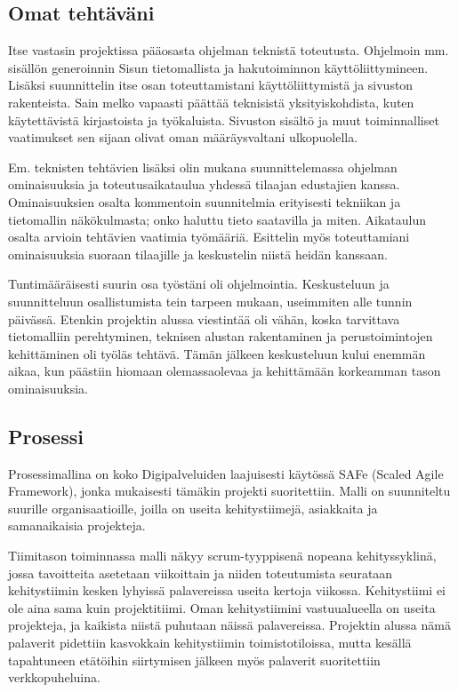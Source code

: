 \documentclass{article}
\begin{document}
\subsection{Omat tehtäväni}

Itse vastasin projektissa pääosasta ohjelman teknistä toteutusta. Ohjelmoin mm.
sisällön generoinnin Sisun tietomallista ja hakutoiminnon käyttöliittymineen.
Lisäksi suunnittelin itse osan toteuttamistani käyttöliittymistä ja sivuston
rakenteista. Sain melko vapaasti päättää teknisistä yksityiskohdista, kuten
käytettävistä kirjastoista ja työkaluista. Sivuston sisältö ja muut
toiminnalliset vaatimukset sen sijaan olivat oman määräysvaltani ulkopuolella.

Em. teknisten tehtävien lisäksi olin mukana suunnittelemassa ohjelman
ominaisuuksia ja toteutusaikataulua yhdessä tilaajan edustajien kanssa.
Ominaisuuksien osalta kommentoin suunnitelmia erityisesti tekniikan ja
tietomallin näkökulmasta; onko haluttu tieto saa\-ta\-vil\-la ja mi\-ten.
Aikataulun osalta arvioin tehtävien vaatimia työmääriä. Esittelin myös
toteuttamiani ominaisuuksia suoraan tilaajille ja keskustelin niistä heidän
kanssaan.

Tuntimääräisesti suurin osa työstäni oli ohjelmointia. Keskusteluun ja
suunnitteluun osallistumista tein tarpeen mukaan, useimmiten alle tunnin
päivässä. Etenkin projektin alussa viestintää oli vähän, koska tarvittava
tietomalliin perehtyminen, teknisen alustan rakentaminen ja perustoimintojen
kehittäminen oli työläs tehtävä. Tämän jälkeen keskusteluun kului enemmän
aikaa, kun päästiin hio\-maan olemassaolevaa ja kehittämään korkeamman tason
ominaisuuksia.

\subsection{Prosessi}

Prosessimallina on koko Digipalveluiden laajuisesti käytössä SAFe (Scaled Agile
Framework), jonka mu\-kai\-ses\-ti tämäkin projekti suoritettiin. Malli on
suunniteltu suurille organisaatioille, joilla on useita kehitystiimejä,
asiakkaita ja samanaikaisia projekteja.

Tiimitason toiminnassa malli näkyy scrum-tyyppisenä nopeana kehityssyklinä,
jossa tavoitteita ase\-tetaan viikoittain ja niiden toteutumista seurataan
kehitystiimin kesken lyhyissä palavereissa useita kertoja viikossa.
Kehitystiimi ei ole aina sama kuin projektitiimi. Oman kehitystiimini
vastuualueella on useita projekteja, ja kaikista niistä puhutaan näissä
palavereissa. Projektin alussa nämä palaverit pidettiin kasvokkain kehitystiimin
toimistotiloissa, mutta kesällä tapahtuneen etätöihin siirtymisen jälkeen myös
palaverit suoritettiin verkkopuheluina.
\end{document}
